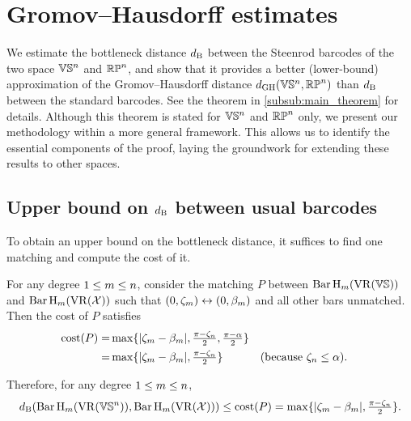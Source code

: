 
\section{Gromov--Hausdorff estimates}\label{prop:db estimate}

We estimate the bottleneck distance $\db$ between the Steenrod barcodes of the two space $\VS^n$ and $\rp^n$, and show that it provides a better (lower-bound) approximation of the Gromov--Hausdorff distance $\dgh(\VS^n, \rp^n)$ than $\db$ between the standard barcodes.
See the theorem in \cref{subsub:main_theorem} for details.
Although this theorem is stated for $\VS^n$ and $\rp^n$ only, we present our methodology within a more general framework.
This allows us to identify the essential components of the proof, laying the groundwork for extending these results to other spaces.

\subsection{Upper bound on $\db$ between usual barcodes}
\label{subsub:db_upper_bound}

To obtain an upper bound on the bottleneck distance, it suffices to find one matching and compute the cost of it. 

For any degree $1 \leq \degp \leq n$, consider the matching $P$ between $\Hbarc[\field]{\degp}{\VS}$ and $\Hbarc[\field]{\degp}{\cX}$ such that $(0,\zeta_\degp ) \leftrightarrow (0, \beta_\degp )$ and all other bars unmatched. 
Then the cost of $P$ satisfies
\begin{align*}
    \cost(P) 
    = & \max\{|\zeta_\degp  - \beta_\degp |, \tfrac{\pi - \zeta_n}{2}, \tfrac{\pi - \alpha}{2}\} \\
    = & \max\{|\zeta_\degp  - \beta_\degp |, \tfrac{\pi - \zeta_n}{2}\} && \mbox{(because $\zeta_n \leq \alpha$)}.
\end{align*}

Therefore, for any degree $1 \leq \degp \leq n$,
\begin{equation}\label{eq:db_usual_upper_bound}
    \db(\Hbarc[\field]{\degp}{\VS^n}, \Hbarc[\field]{\degp}{\cX})
    \leq \cost(P) 
    = \max\{|\zeta_\degp  - \beta_\degp |, \tfrac{\pi - \zeta_n}{2}\}.
\end{equation}


